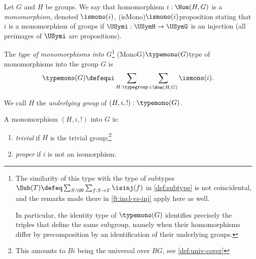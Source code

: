 \begin{definition}
  \label{def:typeofmono}
  Let $G$ and $H$ be groups. We say that homomorphism $i: \Hom(H,G)$ is
  a \emph{monomorphism}, denoted $\ismono(i)$,%
  \glossary(isMono){$\protect\ismono(i)$}{proposition stating that
    $i$ is a monomorphism of groups}
  if $\USymi:\USymH\to \USymG$ is an injection  
  (all preimages of $\USymi$ are propositions).
  
  The \emph{type of monomorphisms into $G$}\footnote{%
  The similarity of this type with the type of subtypes
  $\Sub(T) \defeq \sum_{S:\UU}\sum_{f:S\to T}\isinj(f)$ in
  \cref{def:subtype} is not coincidental, and the remarks made 
  there in \cref{ft:incl-vs-inj} apply here as well.
  
  In particular, the identity type of $\typemono(G)$
  identifies precisely the triples that define the same subgroup,
  namely when their homomorphisms differ by precomposition by an 
  identification of their underlying groups.
  
  }
  \glossary(MonoG){$\protect{\typemono(G)}$}{type of monomorphisms%
  into the group $G$} 
  is
  \[
  \typemono(G)\defequi\sum_{H:\typegroup}\sum_{i:\Hom(H,G)}\ismono(i).
  \]
  
  We call $H$ the \emph{underlying group} of $(H,i,!) : \typemono(G)$.
  
  A monomorphism $(H,i,!)$ into $G$ is:
      \begin{enumerate}
      \item \emph{trivial} 
      if $H$ is the trivial group;\footnote{This amounts to $Bi$
      being the universal \covering over $BG$, see \cref{def:univ-cover}}
      \item \emph{proper} if $i$ is 
      not an isomorphism.\qedhere
      \end{enumerate}
\end{definition}
    

